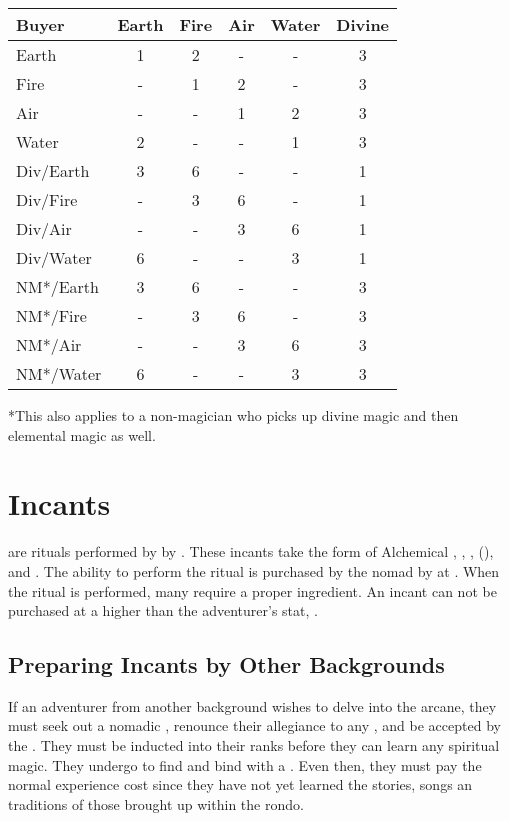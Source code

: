 \begin{multicols*}{2}
\begin{normboxc}
\small
\begin{tabular}{@{}l c c c c c}
\textbf{Buyer} & \textbf{Earth}  & \textbf{Fire} & \textbf{Air} & \textbf{Water}  & \textbf{Divine}\\
\midrule
Earth & 1 & 2 & - & - & 3\\
Fire & - & 1 & 2 & - & 3\\
Air & - & - & 1 & 2 & 3\\
Water & 2 & - & - & 1 & 3\\
Div/Earth & 3 & 6 & - & - & 1\\
Div/Fire & - & 3 & 6 & - & 1\\
Div/Air & - & - & 3 & 6 & 1\\
Div/Water & 6 & - & - & 3 & 1\\
NM*/Earth & 3 & 6 & - & - & 3\\
NM*/Fire & - & 3 & 6 & - & 3\\
NM*/Air & - & - & 3 & 6 & 3\\
NM*/Water & 6 & - & - & 3 & 3\\
\end{tabular}
\end{normboxc}

*This also applies to a non-magician who picks up divine magic and then elemental magic as well.
\section{Incants}
 are rituals performed by by . These
incants take the form of Alchemical , , ,  (), and . The ability to perform the ritual is purchased by the nomad by  at . When the ritual is performed, many require a proper ingredient. An incant can not be purchased at a  higher than  the adventurer's \PER stat, .
\subsection{Preparing Incants by Other Backgrounds}
If an adventurer from another background wishes to delve into the arcane, they must seek out a nomadic , renounce their allegiance to any , and be accepted by the . They must be inducted into their ranks before they can learn any spiritual magic. They undergo  to find and bind with a . Even then, they must pay  the normal experience cost since they have not yet learned the stories, songs an traditions of those brought up within the rondo.


\end{multicols*}
